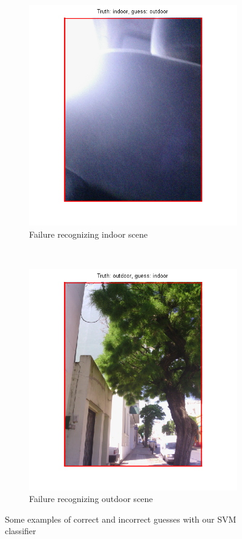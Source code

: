 \begin{figure}[htb]
	\begin{subfigure}[t]{0.4\textwidth}
		\includegraphics[width=\textwidth]{./img/ex2/indoor-failed.png}
		\caption{Failure recognizing indoor scene}
		\label{fig:indoor-failed}
	\end{subfigure}
	~
	\begin{subfigure}[t]{0.4\textwidth}
		\includegraphics[width=\textwidth]{./img/ex2/outdoor-failed.png}
		\caption{Failure recognizing outdoor scene}
		\label{fig:outdoor-failed}
	\end{subfigure}
	
\caption{Some examples of correct and incorrect guesses with our SVM classifier}
\label{fig:svm-graphical-results}
\end{figure}
